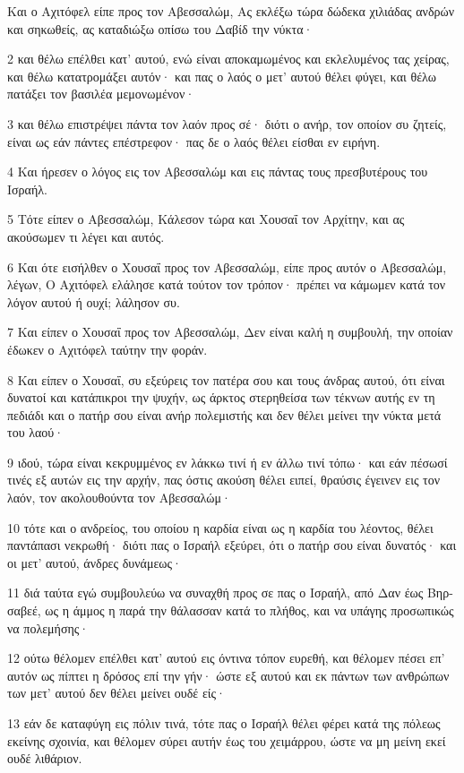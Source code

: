 \par Και ο Αχιτόφελ είπε προς τον Αβεσσαλώμ, Ας εκλέξω τώρα δώδεκα χιλιάδας ανδρών και σηκωθείς, ας καταδιώξω οπίσω του Δαβίδ την νύκτα·
\par 2 και θέλω επέλθει κατ' αυτού, ενώ είναι αποκαμωμένος και εκλελυμένος τας χείρας, και θέλω κατατρομάξει αυτόν· και πας ο λαός ο μετ' αυτού θέλει φύγει, και θέλω πατάξει τον βασιλέα μεμονωμένον·
\par 3 και θέλω επιστρέψει πάντα τον λαόν προς σέ· διότι ο ανήρ, τον οποίον συ ζητείς, είναι ως εάν πάντες επέστρεφον· πας δε ο λαός θέλει είσθαι εν ειρήνη.
\par 4 Και ήρεσεν ο λόγος εις τον Αβεσσαλώμ και εις πάντας τους πρεσβυτέρους του Ισραήλ.
\par 5 Τότε είπεν ο Αβεσσαλώμ, Κάλεσον τώρα και Χουσαΐ τον Αρχίτην, και ας ακούσωμεν τι λέγει και αυτός.
\par 6 Και ότε εισήλθεν ο Χουσαΐ προς τον Αβεσσαλώμ, είπε προς αυτόν ο Αβεσσαλώμ, λέγων, Ο Αχιτόφελ ελάλησε κατά τούτον τον τρόπον· πρέπει να κάμωμεν κατά τον λόγον αυτού ή ουχί; λάλησον συ.
\par 7 Και είπεν ο Χουσαΐ προς τον Αβεσσαλώμ, Δεν είναι καλή η συμβουλή, την οποίαν έδωκεν ο Αχιτόφελ ταύτην την φοράν.
\par 8 Και είπεν ο Χουσαΐ, συ εξεύρεις τον πατέρα σου και τους άνδρας αυτού, ότι είναι δυνατοί και κατάπικροι την ψυχήν, ως άρκτος στερηθείσα των τέκνων αυτής εν τη πεδιάδι και ο πατήρ σου είναι ανήρ πολεμιστής και δεν θέλει μείνει την νύκτα μετά του λαού·
\par 9 ιδού, τώρα είναι κεκρυμμένος εν λάκκω τινί ή εν άλλω τινί τόπω· και εάν πέσωσί τινές εξ αυτών εις την αρχήν, πας όστις ακούση θέλει ειπεί, θραύσις έγεινεν εις τον λαόν, τον ακολουθούντα τον Αβεσσαλώμ·
\par 10 τότε και ο ανδρείος, του οποίου η καρδία είναι ως η καρδία του λέοντος, θέλει παντάπασι νεκρωθή· διότι πας ο Ισραήλ εξεύρει, ότι ο πατήρ σου είναι δυνατός· και οι μετ' αυτού, άνδρες δυνάμεως·
\par 11 διά ταύτα εγώ συμβουλεύω να συναχθή προς σε πας ο Ισραήλ, από Δαν έως Βηρ-σαβεέ, ως η άμμος η παρά την θάλασσαν κατά το πλήθος, και να υπάγης προσωπικώς να πολεμήσης·
\par 12 ούτω θέλομεν επέλθει κατ' αυτού εις όντινα τόπον ευρεθή, και θέλομεν πέσει επ' αυτόν ως πίπτει η δρόσος επί την γήν· ώστε εξ αυτού και εκ πάντων των ανθρώπων των μετ' αυτού δεν θέλει μείνει ουδέ είς·
\par 13 εάν δε καταφύγη εις πόλιν τινά, τότε πας ο Ισραήλ θέλει φέρει κατά της πόλεως εκείνης σχοινία, και θέλομεν σύρει αυτήν έως του χειμάρρου, ώστε να μη μείνη εκεί ουδέ λιθάριον.
